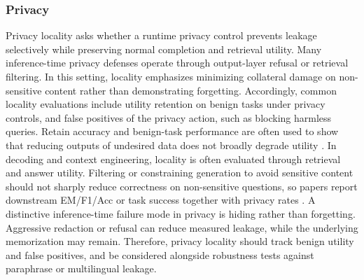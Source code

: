 \subsubsection{Privacy}
Privacy locality asks whether a runtime privacy control prevents leakage selectively while preserving normal completion and retrieval utility. Many inference-time privacy defenses operate through output-layer refusal or retrieval filtering. In this setting, locality emphasizes minimizing collateral damage on non-sensitive content rather than demonstrating forgetting. Accordingly, common locality evaluations include utility retention on benign tasks under privacy controls, and false positives of the privacy action, such as blocking harmless queries. Retain accuracy and benign-task performance are often used to show that reducing outputs of undesired data does not broadly degrade utility \citep{pawelczyk2023context, DBLP:conf/inlg/IppolitoTNZJLCC23, Borec2024TheUI, yan2025dual}. In decoding and context engineering, locality is often evaluated through retrieval and answer utility. Filtering or constraining generation to avoid sensitive content should not sharply reduce correctness on non-sensitive questions, so papers report downstream EM/F1/Acc or task success together with privacy rates \citep{Wang2025PrivacyAwareDM, Ok2024DecodingWL, Wei2024PrivacyRO, zou2025poisonedrag}. A distinctive inference-time failure mode in privacy is hiding rather than forgetting. Aggressive redaction or refusal can reduce measured leakage, while the underlying memorization may remain. Therefore, privacy locality should track benign utility and false positives, and be considered alongside robustness tests against paraphrase or multilingual leakage.


